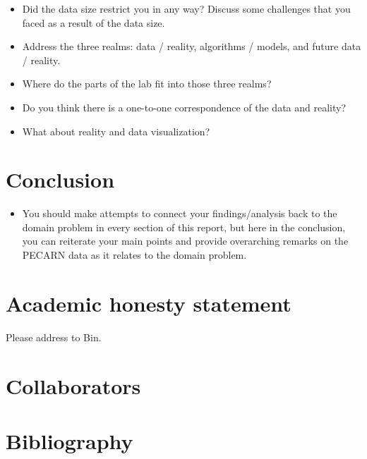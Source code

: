 \documentclass[10pt,letterpaper]{article}
\begin{document}
\begin{itemize}
\item Did the data size restrict you in any way? Discuss some challenges that you faced as a result of the data size.
\item Address the three realms: data / reality, algorithms / models, and future data / reality.
\item Where do the parts of the lab fit into those three realms?
\item Do you think there is a one-to-one correspondence of the data and reality?
\item What about reality and data visualization?
\end{itemize}


\section{Conclusion}\label{conclusion}

\begin{itemize}
\item You should make attempts to connect your findings/analysis back to the domain problem in every section of this report, but here in the conclusion, you can reiterate your main points and provide overarching remarks on the PECARN data as it relates to the domain problem.
\end{itemize}

\section{Academic honesty statement}\label{academic-honesty-statement}

Please address to Bin.

\section{Collaborators}\label{collaborators}

\section{Bibliography}\label{bibliography}
\end{document}
